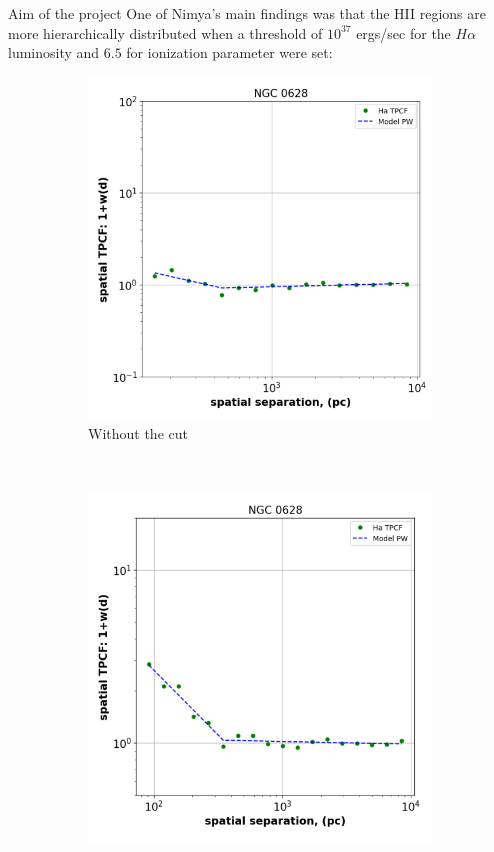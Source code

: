 \documentclass{beamer}
\begin{document}
\begin{frame}{Aim of the project}
    One of Nimya's main findings was that the HII regions are more hierarchically distributed when a threshold of $10^{37}$ ergs/sec for the $H\alpha$ luminosity and $6.5$ for ionization parameter were set: 

    \begin{figure}[H]
        \centering
        \begin{subfigure}{0.45\textwidth}
            \centering
            \includegraphics[scale = 0.21]{tpcf_without_cut.png}
            \caption{Without the cut}
            \label{fig:tpcf_without_cut}
        \end{subfigure}
        ~
        \begin{subfigure}{0.45\textwidth}
            \centering
            \includegraphics[scale = 0.21]{tpcf_with_cut.png}

\end{subfigure}
\end{figure}
\end{frame}
\end{document}

